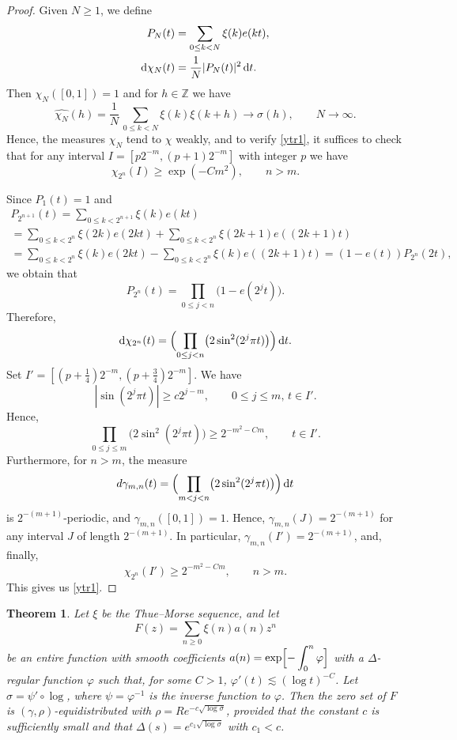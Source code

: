 \documentclass[11pt]{amsart}
\numberwithin{equation}{section}
\newtheorem{theorem}{Theorem}
\begin{document}
\begin{proof}
Given $N\ge 1$, we define
\begin{align*}
P_N(t)&=\sum_{0\le k<N}\xi(k)e(kt),\\
{\rm d}\chi_N(t)&=\frac1N|P_N(t)|^2\,{\rm d}t.
\end{align*}
Then $\chi_N([0,1])=1$ and for $h\in\mathbb Z$ we have
$$
\widehat{\chi_N}(h)=\frac1N\, \sum_{0\le k<N}\xi(k)\xi(k+h)\to\sigma(h),\qquad N\to\infty.
$$
Hence, the measures $\chi_N$ tend to $\chi$ weakly, and to verify \eqref{ytr1}, it suffices to check that for any interval
$I=[p2^{-m},(p+1)2^{-m}]$ with integer $p$ we have
$$
\chi_{2^n}(I)\ge \exp(-Cm^2),\qquad n>m.
$$

Since $P_1(t)=1$ and
\begin{multline*}
P_{2^{n+1}}(t)=\sum_{0\le k<2^{n+1}}\xi(k)e(kt)\\=\sum_{0\le k<2^n}\xi(2k)e(2kt)+\sum_{0\le k<2^n}\xi(2k+1)e((2k+1)t)\\=
\sum_{0\le k<2^n}\xi(k)e(2kt)-\sum_{0\le k<2^n}\xi(k)e((2k+1)t)=(1-e(t))P_{2^n}(2t),
\end{multline*}
we obtain that
$$
P_{2^n}(t)=\prod_{0\le j<n}\bigl(1-e(2^jt)\bigr).
$$
Therefore,
$$
{\rm d}\chi_{2^n}(t)=\Bigl( \prod_{0\le j<n}\bigl(2\sin^2(2^j\pi t)\bigr)\Bigr) \,{\rm d}t.
$$
Set $I'=[(p+\frac14)2^{-m},(p+\frac34)2^{-m}]$. We have
$$
|\sin(2^j\pi t)|\ge c2^{j-m},\qquad 0\le j\le m,\,t\in I'.
$$
Hence,
$$
\prod_{0\le j\le m}\bigl(2\sin^2(2^j\pi t)\bigr)\ge 2^{-m^2-Cm},\qquad t\in I'.
$$
Furthermore, for $n>m$, the measure
$$
d\gamma_{m,n}(t)=\Bigl( \prod_{m<j<n}\bigl(2\sin^2(2^j\pi t)\bigr)\Bigr)\,{\rm d}t
$$
is $2^{-(m+1)}$-periodic, and $\gamma_{m,n}([0,1])=1$. Hence, $\gamma_{m,n}(J)=2^{-(m+1)}$ for any interval $J$ of length $2^{-(m+1)}$.
In particular, $\gamma_{m,n}(I')=2^{-(m+1)}$, and, finally,
$$
\chi_{2^n}(I')\ge 2^{-m^2-Cm},\qquad n>m.
$$
This gives us \eqref{ytr1}.
\end{proof}

\begin{theorem}\label{thm:TM}
Let $\xi$ be the Thue--Morse sequence, and let 
$$ 
F(z) = \displaystyle \sum_{n\ge 0} \xi(n) a(n) z^n 
$$
be an entire function with smooth coefficients
$ a(n) = \displaystyle \exp\Bigl[ - \int_0^n \varphi \Bigr] $ with a $\Delta$-regular function
$\varphi$ such that, for some $C>1$,
$ \varphi'(t) \lesssim (\log t)^{-C} $.
Let $\sigma = \psi' \circ \log$, where $\psi=\varphi^{-1}$ is the inverse function to $\varphi$.
Then the zero set of $F$ is $(\gamma, \rho)$-equidistributed with $\rho = R e^{-c\sqrt{\log\sigma}}$,
provided that the constant $c$ is sufficiently small and that $\Delta (s) =
e^{c_1\sqrt{\log\sigma}}$ with $c_1<c$.
\end{theorem}
\end{document}
